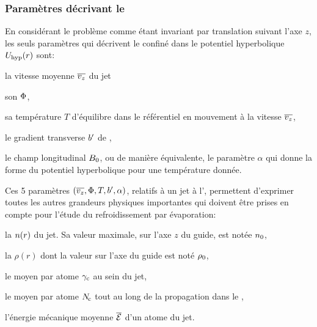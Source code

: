 	\subsubsection{Paramètres décrivant le \jat}
En considérant le problème comme étant invariant par translation suivant l'axe $z$, les seuls paramètres qui décrivent le \jat confiné dans le potentiel hyperbolique ${U_{\rm hyp}}(r)$ sont:
	\begin{itemizel}
	\item la vitesse moyenne ${\overline{v_z}}$ du jet
	\item son \fat ${\Phi}$,%
%
	\item sa température $T$ d'équilibre dans le référentiel en mouvement à la vitesse ${\overline{v_z}}$,
	\item le gradient transverse ${b'}$ de \chm,
	\item le champ longitudinal ${B_0}$, ou de manière équivalente, le paramètre $\alpha$ qui donne la forme du potentiel hyperbolique pour une température donnée.
\end{itemizel}
%
Ces 5 paramètres $({\overline{v_z}}, {\Phi}, T, {b'}, \alpha)$, relatifs à un jet à l'\eqthdy, permettent d'exprimer toutes les autres grandeurs physiques importantes qui doivent être prises en compte pour l'étude du refroidissement par évaporation:
\begin{itemizel}
	\item la \dat ${n}(r)$ du jet. Sa valeur maximale, sur l'axe $z$ du guide, est notée ${n_{0}}$, %
%
	\item la \ddedpup $\rho(r)$ dont la valeur sur l'axe du guide est noté ${\rho_{0}}$, %
% 
	\item le \tcolel moyen par atome ${\gamma_{\rm c}}$ au sein du jet, %
%
	\item le \Ncolel moyen par atome ${N_{\hspace{-1pt}\rm c}}$ tout au long de la propagation dans le \gm, %
%
	\item l'énergie mécanique moyenne $\overline{{\mathcal{E}}}$ d'un atome du jet. %
%
\end{itemizel}
